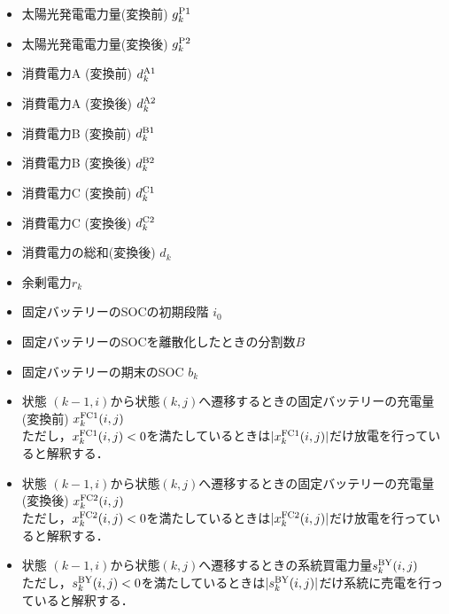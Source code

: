 \documentclass{jarticle}
\newcommand{\IB}{$\bullet$}
\newcommand{\IC}{$\circ$}
\begin{document}
 \begin{itemize}
  \item[\IB] 太陽光発電電力量(変換前) $g^{\rm P1}_{k}$
  \item[\IB] 太陽光発電電力量(変換後) $g^{\rm P2}_{k}$
  \item[\IB] 消費電力A (変換前) $d^{\rm A1}_{k}$
 \item[\IB] 消費電力A (変換後) $d^{\rm A2}_{k}$
  \item[\IB] 消費電力B (変換前) $d^{\rm B1}_{k}$
  \item[\IB] 消費電力B (変換後) $d^{\rm B2}_{k}$
 \item[\IB] 消費電力C (変換前) $d^{\rm C1}_{k}$
  \item[\IB] 消費電力C (変換後) $d^{\rm C2}_{k}$
  \item[\IB] 消費電力の総和(変換後) $d_{k}$
  \item[\IB]余剰電力$r_{k}$
  \item[\IB] 固定バッテリーのSOCの初期段階 $i_{0}$
  \item[\IB] 固定バッテリーのSOCを離散化したときの分割数$B$
  \item[\IC] 固定バッテリーの期末のSOC $b_{k}$
  \item[\IC] 状態 $(k-1,i)$から状態$(k,j)$へ遷移するときの固定バッテリーの充電量(変換前) $x^{\rm FC1}_{k}(i,j)$
  \\ただし，$x^{\rm FC1}_{k}(i,j) < 0$を満たしているときは$|x^{\rm FC1}_{k}(i,j)|$だけ放電を行っていると解釈する．
  \item[\IC] 状態 $(k-1,i)$から状態$(k,j)$へ遷移するときの固定バッテリーの充電量(変換後) $x^{\rm FC2}_{k}(i,j)$
   \\ただし，$x^{\rm FC2}_{k}(i,j) < 0$を満たしているときは$|x^{\rm FC2}_{k}(i,j)|$だけ放電を行っていると解釈する．

  \item[\IC]  状態 $(k-1,i)$から状態$(k,j)$へ遷移するときの系統買電力量$s^{\rm BY}_{k}(i,j)$  \\ただし，$s^{\rm BY}_{k}(i,j)< 0$を満たしているときは$|s^{\rm BY}_{k}(i,j) |$だけ系統に売電を行っていると解釈する．
  
\end{itemize}
\end{document}
